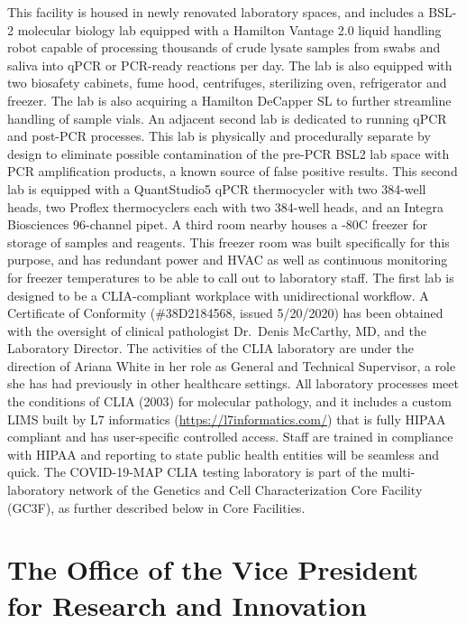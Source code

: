 \documentclass[
]{book}
\begin{document}
This facility is housed in newly renovated laboratory spaces, and includes a BSL-2 molecular biology lab equipped with a Hamilton Vantage 2.0 liquid handling robot capable of processing thousands of crude lysate samples from swabs and saliva into qPCR or PCR-ready reactions per day. The lab is also equipped with two biosafety cabinets, fume hood, centrifuges, sterilizing oven, refrigerator and freezer. The lab is also acquiring a Hamilton DeCapper SL to further streamline handling of sample vials. An adjacent second lab is dedicated to running qPCR and post-PCR processes. This lab is physically and procedurally separate by design to eliminate possible contamination of the pre-PCR BSL2 lab space with PCR amplification products, a known source of false positive results. This second lab is equipped with a QuantStudio5 qPCR thermocycler with two 384-well heads, two Proflex thermocyclers each with two 384-well heads, and an Integra Biosciences 96-channel pipet. A third room nearby houses a -80C freezer for storage of samples and reagents. This freezer room was built specifically for this purpose, and has redundant power and HVAC as well as continuous monitoring for freezer temperatures to be able to call out to laboratory staff. The first lab is designed to be a CLIA-compliant workplace with unidirectional workflow. A Certificate of Conformity (\#38D2184568, issued 5/20/2020) has been obtained with the oversight of clinical pathologist Dr.~Denis McCarthy, MD, and the Laboratory Director. The activities of the CLIA laboratory are under the direction of Ariana White in her role as General and Technical Supervisor, a role she has had previously in other healthcare settings. All laboratory processes meet the conditions of CLIA (2003) for molecular pathology, and it includes a custom LIMS built by L7 informatics (\url{https://l7informatics.com/}) that is fully HIPAA compliant and has user-specific controlled access. Staff are trained in compliance with HIPAA and reporting to state public health entities will be seamless and quick. The COVID-19-MAP CLIA testing laboratory is part of the multi-laboratory network of the Genetics and Cell Characterization Core Facility (GC3F), as further described below in Core Facilities.

\hypertarget{the-office-of-the-vice-president-for-research-and-innovation}{%
\section{The Office of the Vice President for Research and Innovation}\label{the-office-of-the-vice-president-for-research-and-innovation}}
\end{document}
